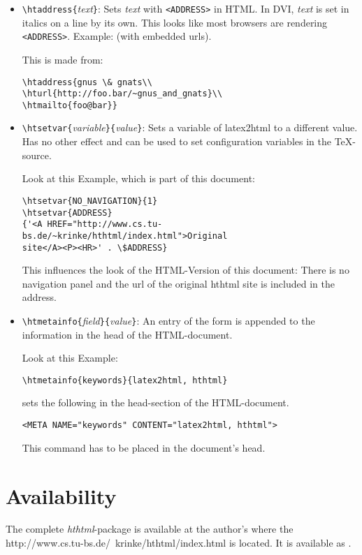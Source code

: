 \documentclass[11pt,a4paper]{article}
\begin{document}
\begin{itemize}
\item \verb|\htaddress{|\emph{text}\verb|}|:  Sets \emph{text} with
  \verb|<ADDRESS>| in HTML.  In DVI, \emph{text} is set in italics on
  a line by its own.  This looks like most browsers are rendering
  \verb|<ADDRESS>|. Example:  (with embedded urls).

This is made from:
\begin{verbatim}
\htaddress{gnus \& gnats\\
\hturl{http://foo.bar/~gnus_and_gnats}\\
\htmailto{foo@bar}}
\end{verbatim}

\item \verb|\htsetvar{|\emph{variable}\verb|}{|\emph{value}\verb|}|:
  Sets a variable of latex2html to a different value.  Has no other
  effect and can be used to set configuration variables in the
  \TeX-source. 

Look at this Example, which is part of this document:
\begin{verbatim}
\htsetvar{NO_NAVIGATION}{1}
\htsetvar{ADDRESS}
{'<A HREF="http://www.cs.tu-bs.de/~krinke/hthtml/index.html">Original 
site</A><P><HR>' . \$ADDRESS}
\end{verbatim}

This influences the look of the HTML-Version of this document:  There
is no navigation panel and the url of the original hthtml site is
included in the address.\par

\item \verb|\htmetainfo{|\emph{field}\verb|}{|\emph{value}\verb|}|:
  An entry of the form \verb|| is appended to the information in the
  head of the HTML-document.


Look at this Example:
\begin{verbatim}
\htmetainfo{keywords}{latex2html, hthtml}
\end{verbatim}

    sets the following in the head-section of the HTML-document.
\begin{verbatim}
<META NAME="keywords" CONTENT="latex2html, hthtml">
\end{verbatim}

    This command has to be placed in the document's head.
\end{itemize}

\section{Availability}

The complete \emph{hthtml}-package is available at the author's
 where the
{http://www.cs.tu-bs.de/~krinke/hthtml/index.html} is located.  It is
available as .
\end{document}
